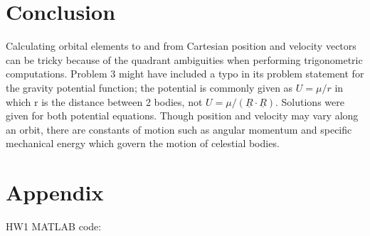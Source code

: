 \documentclass[conf]{new-aiaa}
\begin{document}
%
%
%
%

\section{Conclusion} 

Calculating orbital elements to and from Cartesian position and velocity vectors can be tricky because of the quadrant ambiguities when performing trigonometric computations. Problem 3 might have included a typo in its problem statement for the gravity potential function; the potential is commonly given as $U = \mu/r$ in which r is the distance between 2 bodies, not $U = \mu / ( \underline{R} \cdot \underline{R} )$. Solutions were given for both potential equations. Though position and velocity may vary along an orbit, there are constants of motion such as angular momentum and specific mechanical energy which govern the motion of celestial bodies. 




\newpage
\section{Appendix} 

HW1 MATLAB code: 
\end{document}
